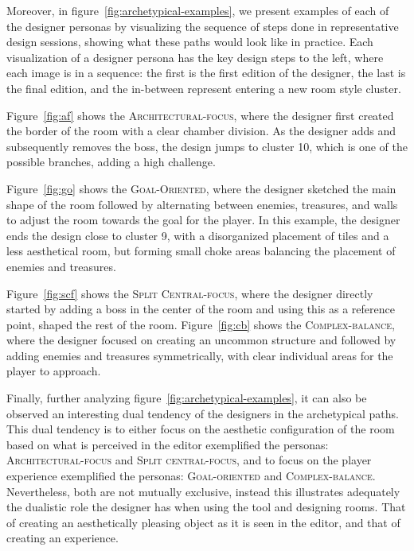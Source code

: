 
Moreover, in figure~\ref{fig:archetypical-examples}, we present examples of each of the designer personas by visualizing the sequence of steps done in representative design sessions, showing what these paths would look like in practice. Each visualization of a designer persona has the key design steps to the left, where each image is in a sequence: the first is the first edition of the designer, the last is the final edition, and the in-between represent entering a new room style cluster. 

Figure~\ref{fig:af} shows the \textsc{Architectural-focus}, where the designer first created the border of the room with a clear chamber division. As the designer adds and subsequently removes the boss, the design jumps to cluster 10, which is one of the possible branches, adding a high challenge. 

Figure~\ref{fig:go} shows the \textsc{Goal-Oriented}, where the designer sketched the main shape of the room followed by alternating between enemies, treasures, and walls to adjust the room towards the goal for the player. In this example, the designer ends the design close to cluster 9, with a disorganized placement of tiles and a less aesthetical room, but forming small choke areas balancing the placement of enemies and treasures.

Figure~\ref{fig:scf} shows the \textsc{Split Central-focus}, where the designer directly started by adding a boss in the center of the room and using this as a reference point, shaped the rest of the room. Figure~\ref{fig:cb} shows the \textsc{Complex-balance}, where the designer focused on creating an uncommon structure and followed by adding enemies and treasures symmetrically, with clear individual areas for the player to approach.


Finally, further analyzing figure~\ref{fig:archetypical-examples}, it can also be observed an interesting dual tendency of the designers in the archetypical paths. This dual tendency is to either focus on the aesthetic configuration of the room based on what is perceived in the editor exemplified the personas: \textsc{Architectural-focus} and \textsc{Split central-focus}, and to focus on the player experience exemplified the personas: \textsc{Goal-oriented} and \textsc{Complex-balance}. Nevertheless, both are not mutually exclusive, instead this illustrates adequately the dualistic role the designer has when using the tool and designing rooms. That of creating an aesthetically pleasing object as it is seen in the editor, and that of creating an experience.%

